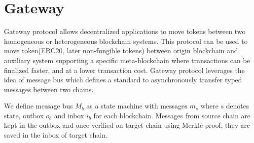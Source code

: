 \documentclass[12pt,a4paper]{article}
\begin{document}

\newpage
\section{Gateway}\label{gateway}

Gateway protocol allows decentralized applications to move tokens between two homogeneous or heterogeneous blockchain systems. 
This protocol can be used to move token(ERC20, later non-fungible tokens) between origin blockchain and auxiliary system supporting a specific meta-blockchain where transactions can be finalized faster, and at a lower transaction cost. 
Gateway protocol leverages the idea of message bus which defines a standard to asynchronously transfer typed messages between two chains.
 
We define message bus $M_b$ as a state machine with messages $m_s$ where $s$ denotes state, outbox $o_b$ and inbox $i_b$ for each blockchain. Messages from source chain are kept in the outbox
 and once verified on target chain using Merkle proof, they are saved in the inbox of target chain. 
 
\end{document}
